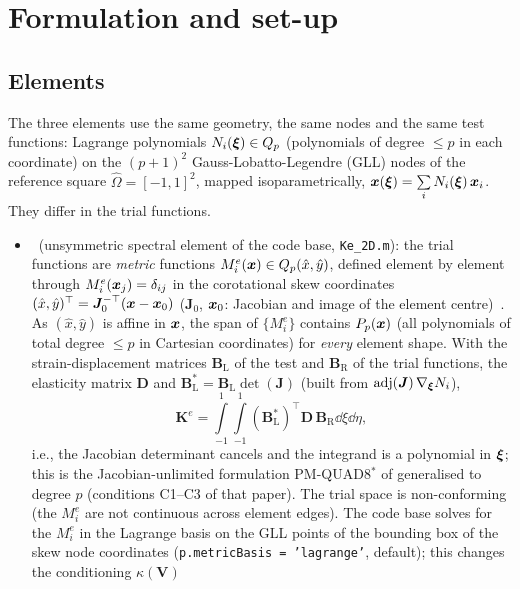 \section{Formulation and set-up}\label{sec:setup}

\subsection{Elements}\label{sec:elements}
The three elements use the same geometry, the same nodes and the same test functions:
Lagrange polynomials $N_i(\bm{\xi})\in Q_p$ (polynomials of degree $\le p$ in each coordinate) on
the $(p+1)^2$ Gauss-Lobatto-Legendre (GLL) nodes of the reference square $\hat\Omega=[-1,1]^2$,
mapped isoparametrically, $\bm{x}(\bm{\xi})=\sum\limits_{i}
N_i(\bm{\xi})\,\bm{x}_i$. They differ in the trial functions.
\begin{itemize}
\item \PM\ (unsymmetric spectral element of the code base, \texttt{Ke\_2D.m}):
  the trial functions are \emph{metric} functions $M_i^e(\bm{x})\in
  Q_p(\hat x,\hat y)$, defined element by element through $M_i^e(\bm{x}_j)=\delta_{ij}$
  in the corotational skew coordinates $(\hat x,\hat y)^\top=\bm
  J_0^{-\top}(\bm{x}-\bm{x}_0)$ ($\bm J_0$, $\bm{x}_0$: Jacobian and image of the element
  centre)~\cite{Xie2016Modified}. As $(\hat x,\hat y)$ is affine in $\bm{x}$, the
  span of $\{M_i^e\}$ contains $P_p(\bm{x})$ (all polynomials of total degree $\le p$
  in Cartesian coordinates) for \emph{every} element shape. With the strain-displacement
  matrices $\bm B_{\mathrm L}$ of the test and $\bm B_{\mathrm R}$ of the trial functions, the
  elasticity matrix $\bm D$ and $\bm B_{\mathrm L}^\ast=\bm B_{\mathrm L}\det(\bm J)$ (built from
  $\operatorname{adj}(\bm J)\,\nabla_{\bm{\xi}}N_i$),
  \begin{equation}
    \bm K^e=\int\limits^{1}_{-1}\int\limits^{1}_{-1}(\bm B_{\mathrm L}^\ast)^\top\bm D\,\bm B_{\mathrm R}\dd\xi\dd\eta ,
    \label{eq:Kpm}
  \end{equation}
  i.e., the Jacobian determinant cancels and the integrand is a polynomial in
  $\bm{\xi}$; this is the Jacobian-unlimited formulation PM-QUAD8$^\ast$ of
  \citet{Rajendran2010technique} generalised to degree $p$ (conditions C1--C3 of
  that paper). The trial space is non-conforming (the $M_i^e$ are not continuous
  across element edges). The code base solves for the $M_i^e$ in the Lagrange basis on the
  GLL points of the bounding box of the skew node coordinates
  (\texttt{p.metricBasis = 'lagrange'}, default); this changes the conditioning $\kappa(\bm V)$

\end{itemize}
